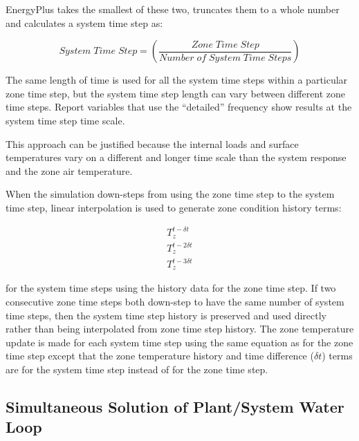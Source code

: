 EnergyPlus takes the smallest of these two, truncates them to a whole number and calculates a system time step as:

\begin{equation}
System\;Time\;Step = \left( {\frac{{Zone\;Time\;Step}}{{Number\;of\;System\;Time\;Steps}}} \right)
\end{equation}

The same length of time is used for all the system time steps within a particular zone time step, but the system time step length can vary between different zone time steps. Report variables that use the ``detailed'' frequency show results at the system time step time scale.

This approach can be justified because the internal loads and surface temperatures vary on a different and longer time scale than the system response and the zone air temperature.

When the simulation down-steps from using the zone time step to the system time step, linear interpolation is used to generate zone condition history terms:

\begin{equation}
\begin{array}{l}
  T_z^{t-\delta t} \\
  T_z^{t-2\delta t} \\
  T_z^{t-3\delta t}
\end{array}
\end{equation}

for the system time steps using the history data for the zone time step. If two consecutive zone time steps both down-step to have the same number of system time steps, then the system time step history is preserved and used directly rather than being interpolated from zone time step history. The zone temperature update is made for each system time step using the same equation as for the zone time step except that the zone temperature history and time difference (\(\delta t\)) terms are for the system time step instead of for the zone time step.

\subsection{Simultaneous Solution of Plant/System Water Loop}\label{simultaneous-solution-of-plantsystem-water-loop}

